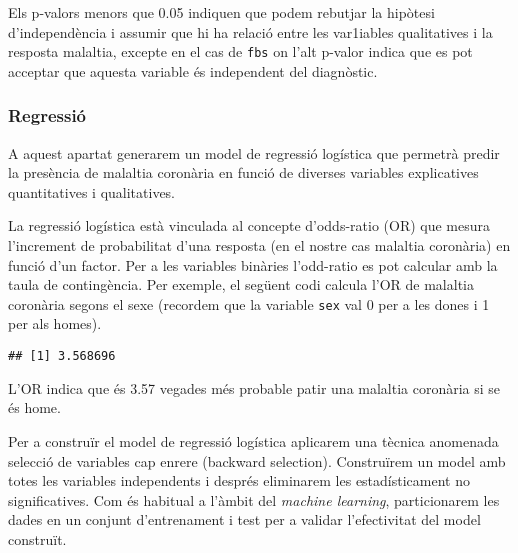 \documentclass[12,]{article}
\newenvironment{Shaded}{\begin{snugshade}}{\end{snugshade}}
\newcommand{\ControlFlowTok}[1]{\textcolor[rgb]{0.13,0.29,0.53}{\textbf{#1}}}
\newcommand{\DecValTok}[1]{\textcolor[rgb]{0.00,0.00,0.81}{#1}}
\newcommand{\KeywordTok}[1]{\textcolor[rgb]{0.13,0.29,0.53}{\textbf{#1}}}
\newcommand{\NormalTok}[1]{#1}
\newcommand{\OperatorTok}[1]{\textcolor[rgb]{0.81,0.36,0.00}{\textbf{#1}}}
\newcommand{\StringTok}[1]{\textcolor[rgb]{0.31,0.60,0.02}{#1}}
\begin{document}
Els p-valors menors que 0.05 indiquen que podem rebutjar la hipòtesi
d'independència i assumir que hi ha relació entre les var1iables
qualitatives i la resposta malaltia, excepte en el cas de \texttt{fbs}
on l'alt p-valor indica que es pot acceptar que aquesta variable és
independent del diagnòstic.

\hypertarget{regressio}{%
\subsubsection{Regressió}\label{regressio}}

A aquest apartat generarem un model de regressió logística que permetrà
predir la presència de malaltia coronària en funció de diverses
variables explicatives quantitatives i qualitatives.

La regressió logística està vinculada al concepte d'odds-ratio (OR) que
mesura l'increment de probabilitat d'una resposta (en el nostre cas
malaltia coronària) en funció d'un factor. Per a les variables binàries
l'odd-ratio es pot calcular amb la taula de contingència. Per exemple,
el següent codi calcula l'OR de malaltia coronària segons el sexe
(recordem que la variable \texttt{sex} val 0 per a les dones i 1 per als
homes).

\begin{Shaded}
\end{Shaded}

\begin{verbatim}
## [1] 3.568696
\end{verbatim}

L'OR indica que és 3.57 vegades més probable patir una malaltia
coronària si se és home.

Per a construïr el model de regressió logística aplicarem una tècnica
anomenada selecció de variables cap enrere (backward selection).
Construïrem un model amb totes les variables independents i després
eliminarem les estadísticament no significatives. Com és habitual a
l'àmbit del \emph{machine learning}, particionarem les dades en un
conjunt d'entrenament i test per a validar l'efectivitat del model
construït.
\end{document}
